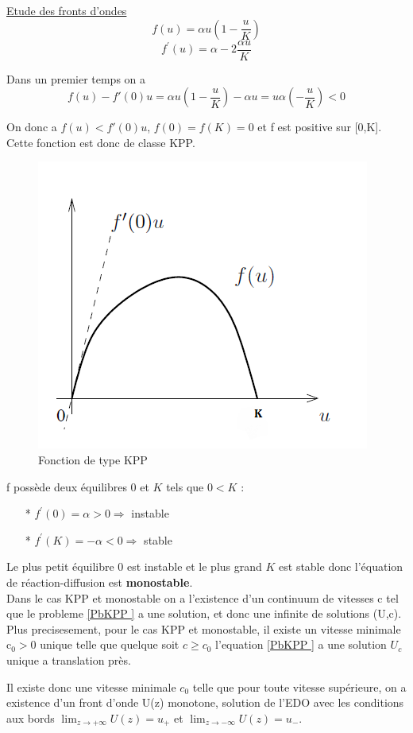 \documentclass[a4paper,11pt]{article}
\begin{document}
\underline{Etude des fronts d'ondes}\\
$$f(u)= \alpha u (1 - \dfrac{u}{K})$$
$$f^\prime(u)= \alpha - 2 \frac{\alpha u}{K}$$


Dans un premier temps on a $$ f(u) - f'(0)u = \alpha u (1 - \dfrac{u}{K}) - \alpha u = u\alpha (- \dfrac{u}{K}) < 0$$

On donc a  $f(u) < f'(0)u$, $f(0) = f(K) = 0$ et f est positive sur [0,K]. Cette fonction est donc de classe KPP.

\begin{figure}[H]
	\centering
	\includegraphics[width=0.40\linewidth]{SimulationKPP/fu}\hfill
	\caption{Fonction de type KPP}
\end{figure}


f possède deux équilibres $0$ et $K$ tels que $0 < K$ :\\
	\begin{itemize}
    	\item[*] $f^\prime(0)= \alpha >0 \Rightarrow $ instable
        \item[*] $f^\prime(K)= -\alpha <0 \Rightarrow $ stable\\
	\end{itemize}
    
    
    Le plus petit équilibre $0$ est instable et le plus grand $K$ est stable donc l'équation de réaction-diffusion est \textbf{monostable}. \\

Dans le cas KPP et monostable on a l'existence d'un continuum de vitesses c tel que le probleme \ref{PbKPP } a une solution, et donc une infinite de solutions (U,c). Plus precisesement, pour le cas KPP et monostable, il existe un vitesse minimale c$_0 >0$ unique telle que quelque soit $c  \geqslant c_0$ l'equation \ref{PbKPP } a une solution $U_c$ unique a translation près.

    Il existe donc une vitesse minimale $c_0$ telle que pour toute vitesse supérieure, on a existence d'un front d'onde U(z) monotone, solution de l'EDO avec les conditions aux bords $\lim_{z \to +\infty} U(z)=u_+$ et $\lim_{z \to -\infty} U(z)=u_-$. \\
    
\end{document}
